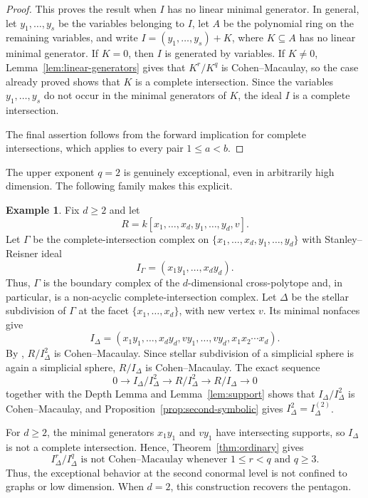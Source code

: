 \documentclass[12pt]{amsart}
\theoremstyle{plain}
\theoremstyle{definition}
\newtheorem{example}[theorem]{Example}
\theoremstyle{remark}
\begin{document}
\begin{proof}
This proves the result when $I$ has no linear minimal generator. In general,
let $y_1,\ldots,y_s$ be the variables belonging to $I$, let $A$ be the
polynomial ring on the remaining variables, and write
$I=(y_1,\ldots,y_s)+K$, where $K\subseteq A$ has no linear minimal
generator. If $K=0$, then $I$ is generated by variables. If $K\neq0$,
Lemma~\ref{lem:linear-generators} gives that $K^r/K^q$ is Cohen--Macaulay,
so the case already proved shows that $K$ is a complete intersection. Since
the variables $y_1,\ldots,y_s$ do not occur in the minimal generators of
$K$, the ideal $I$ is a complete intersection.

The final assertion follows from the forward implication for complete
intersections, which applies to every pair $1\le a<b$.
\end{proof}

The upper exponent $q=2$ is genuinely exceptional, even in arbitrarily high
dimension. The following family makes this explicit.

\begin{example}\label{ex:stellar-family}
Fix $d\ge2$ and let
$$
R=k[x_1,\ldots,x_d,y_1,\ldots,y_d,v].
$$
Let $\Gamma$ be the complete-intersection complex on
$\{x_1,\ldots,x_d,y_1,\ldots,y_d\}$ with Stanley--Reisner ideal
$$
I_\Gamma=(x_1y_1,\ldots,x_dy_d).
$$
Thus, $\Gamma$ is the boundary complex of the $d$-dimensional cross-polytope
and, in particular, is a non-acyclic complete-intersection complex. Let
$\Delta$ be the stellar subdivision of $\Gamma$ at the facet
$\{x_1,\ldots,x_d\}$, with new vertex $v$. Its minimal nonfaces give
$$
I_\Delta=(x_1y_1,\ldots,x_dy_d,vy_1,\ldots,vy_d,x_1x_2\cdots x_d).
$$
By \cite[Theorem~5.4]{RinaldoTeraiYoshida}, $R/I_\Delta^2$ is
Cohen--Macaulay. Since stellar subdivision of a simplicial sphere is again a
simplicial sphere, $R/I_\Delta$ is Cohen--Macaulay. The exact sequence
$$
0\longrightarrow I_\Delta/I_\Delta^2
\longrightarrow R/I_\Delta^2
\longrightarrow R/I_\Delta\longrightarrow0
$$
together with the Depth Lemma and Lemma~\ref{lem:support} shows that
$I_\Delta/I_\Delta^2$ is Cohen--Macaulay, and
Proposition~\ref{prop:second-symbolic} gives
$I_\Delta^2=I_\Delta^{(2)}$.

For $d\ge2$, the minimal generators $x_1y_1$ and $vy_1$ have intersecting
supports, so $I_\Delta$ is not a complete intersection. Hence,
Theorem~\ref{thm:ordinary} gives
$$
I_\Delta^r/I_\Delta^q\text{ is not Cohen--Macaulay whenever }
1\le r<q\text{ and }q\ge3.
$$
Thus, the exceptional behavior at the second conormal level is not confined to
graphs or low dimension. When $d=2$, this construction recovers the pentagon.
\end{example}
\end{document}
